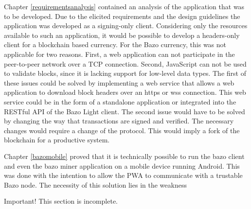 Chapter \ref{requirementsanalysis} contained an analysis of the application that was to be developed. Due to the elicited requirements and the design guidelines the application was developed as a signing-only client. Considering only the resources available to such an application, it would be possible to develop a headers-only client for a blockchain based currency. For the Bazo currency, this was not applicable for two reasons. First, a web application can not participate in the peer-to-peer network over a TCP connection. Second, JavaScript can not be used to validate blocks, since it is lacking support for low-level data types. The first of these issues could be solved by implementing a web service that allows a web application to download block headers over an https or wss connection. This web service could be in the form of a standalone application or integrated into the RESTful API of the Bazo Light client. The second issue would have to be solved by changing the way that transactions are signed and verified. The necessary changes would require a change of the protocol. This would imply a fork of the blockchain for a productive system.

Chapter \ref{bazomobile} proved that it is technically possible to run the bazo client and even the bazo miner application on a mobile device running Android. This was done with the intention to allow the PWA to communicate with a trustable Bazo node. The necessity of this solution lies in the weakness 
\begin{bclogo}[logo=\bcattention, couleurBarre=red, noborder=true, 
               couleur=LightSalmon]{Important!}
This section is incomplete.
\end{bclogo}